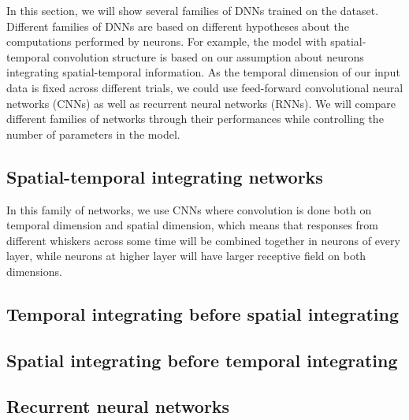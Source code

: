 In this section, we will show several families of DNNs trained on the dataset. Different families of DNNs are based on different hypotheses about the computations performed by neurons. 
For example, the model with spatial-temporal convolution structure is based on our assumption about neurons integrating spatial-temporal information. 
As the temporal dimension of our input data is fixed across different trials, we could use feed-forward convolutional neural networks (CNNs) as well as recurrent neural networks (RNNs).
We will compare different families of networks through their performances while controlling the number of parameters in the model.

\subsection{Spatial-temporal integrating networks}

In this family of networks, we use CNNs where convolution is done both on temporal dimension and spatial dimension, which means that responses from different whiskers across some time will be combined together in neurons of every layer, while neurons at higher layer will have larger receptive field on both dimensions.


\subsection{Temporal integrating before spatial integrating}

\subsection{Spatial integrating before temporal integrating}

\subsection{Recurrent neural networks}